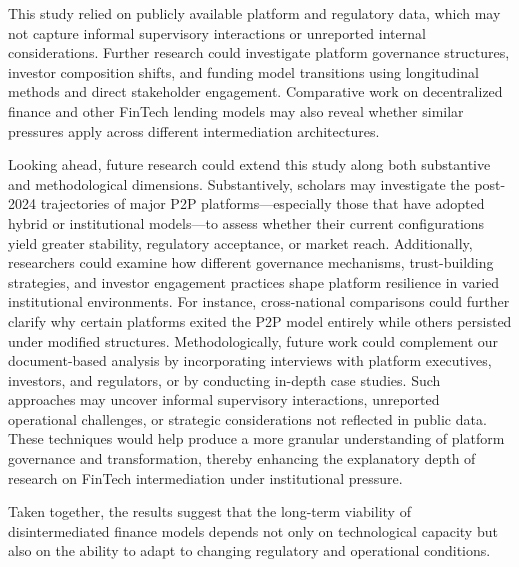 \documentclass[pdflatex,sn-apa]{sn-jnl}%
\theoremstyle{thmstyleone}%
\theoremstyle{thmstyletwo}%
\theoremstyle{thmstylethree}%
\begin{document}
This study relied on publicly available platform and regulatory data, which may not capture informal supervisory interactions or unreported internal considerations. Further research could investigate platform governance structures, investor composition shifts, and funding model transitions using longitudinal methods and direct stakeholder engagement. Comparative work on decentralized finance and other FinTech lending models may also reveal whether similar pressures apply across different intermediation architectures. 

\textcolor{NavyBlue}{
Looking ahead, future research could extend this study along both substantive and methodological dimensions. Substantively, scholars may investigate the post-2024 trajectories of major P2P platforms—especially those that have adopted hybrid or institutional models—to assess whether their current configurations yield greater stability, regulatory acceptance, or market reach. Additionally, researchers could examine how different governance mechanisms, trust-building strategies, and investor engagement practices shape platform resilience in varied institutional environments. For instance, cross-national comparisons could further clarify why certain platforms exited the P2P model entirely while others persisted under modified structures. Methodologically, future work could complement our document-based analysis by incorporating interviews with platform executives, investors, and regulators, or by conducting in-depth case studies. Such approaches may uncover informal supervisory interactions, unreported operational challenges, or strategic considerations not reflected in public data. These techniques would help produce a more granular understanding of platform governance and transformation, thereby enhancing the explanatory depth of research on FinTech intermediation under institutional pressure.
}

Taken together, the results suggest that the long-term viability of disintermediated finance models depends not only on technological capacity but also on the ability to adapt to changing regulatory and operational conditions.

\newpage
\end{document}

